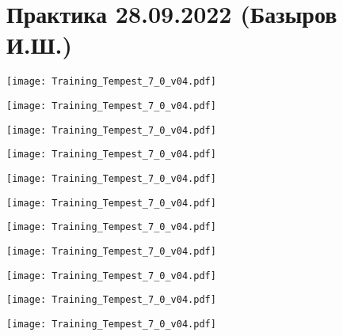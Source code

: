 \documentclass[main.tex]{subfiles}
\begin{document}

\section{Практика 28.09.2022 (Базыров И.Ш.)}


\begin{center}
\texttt{[image: Training\_Tempest\_7\_0\_v04.pdf]}
\end{center}

\begin{center}
\texttt{[image: Training\_Tempest\_7\_0\_v04.pdf]}
\end{center}

\begin{center}
\texttt{[image: Training\_Tempest\_7\_0\_v04.pdf]}
\end{center}

\begin{center}
\texttt{[image: Training\_Tempest\_7\_0\_v04.pdf]}
\end{center}

\begin{center}
\texttt{[image: Training\_Tempest\_7\_0\_v04.pdf]}
\end{center}

\begin{center}
\texttt{[image: Training\_Tempest\_7\_0\_v04.pdf]}
\end{center}

\begin{center}
\texttt{[image: Training\_Tempest\_7\_0\_v04.pdf]}
\end{center}

\begin{center}
\texttt{[image: Training\_Tempest\_7\_0\_v04.pdf]}
\end{center}

\begin{center}
\texttt{[image: Training\_Tempest\_7\_0\_v04.pdf]}
\end{center}

\begin{center}
\texttt{[image: Training\_Tempest\_7\_0\_v04.pdf]}
\end{center}

\begin{center}
\texttt{[image: Training\_Tempest\_7\_0\_v04.pdf]}
\end{center}
\end{document}
